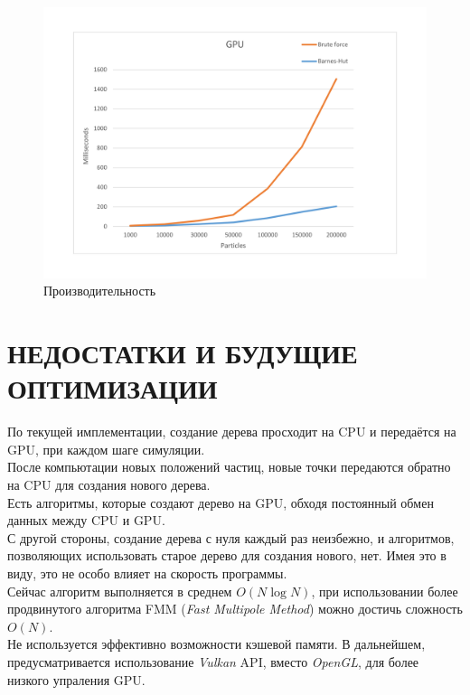 \documentclass{article}
\begin{document}
\begin{figure}[H]
  \centering
  \includegraphics[width=\linewidth]{../images/gpu chart.png}
  \caption {Производительность}
  \label {fig:gpu chart}
  
\end{figure}

\pagebreak
\section{НЕДОСТАТКИ И БУДУЩИЕ ОПТИМИЗАЦИИ}
По текущей имплементации, создание дерева просходит на CPU и передаётся на GPU, при каждом шаге симуляции.\\
После компьютации новых положений частиц, новые точки передаются обратно на CPU для создания нового дерева.\\
Есть алгоритмы, которые создают дерево на GPU, обходя постоянный обмен данных между CPU и GPU.\\
С другой стороны, создание дерева с нуля каждый раз неизбежно, и алгоритмов, позволяющих использовать старое дерево для создания нового, нет. Имея это в виду, это не особо влияет на скорость программы.\\
Сейчас алгоритм выполняется в среднем $O(N\log{N})$, при использовании более продвинутого алгоритма FMM (\textit{Fast Multipole Method}) можно достичь сложность $O(N)$.\\
Не используется эффективно возможности кэшевой памяти.
В дальнейшем, предусматривается использование \textit{Vulkan} API, вместо \textit{OpenGL}, для более низкого упраления GPU.

\clearpage

\nocite{*}

\end{document}
